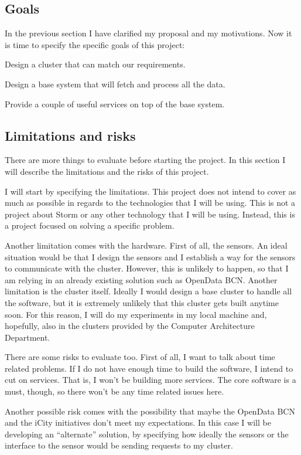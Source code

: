 \subsection{Goals}

In the previous section I have clarified my proposal and my motivations. Now
it is time to specify the specific goals of this project:

\mylist
  \item Design a cluster that can match our requirements.
  \item Design a base system that will fetch and process all the data.
  \item Provide a couple of useful services on top of the base system.
\mylistend

\subsection{Limitations and risks}

There are more things to evaluate before starting the project. In this section
I will describe the limitations and the risks of this project.

I will start by specifying the limitations. This project does not intend to
cover as much as possible in regards to the technologies that I will be using.
This is not a project about Storm or any other technology that I will be using.
Instead, this is a project focused on solving a specific problem.

Another limitation comes with the hardware. First of all, the sensors. An ideal
situation would be that I design the sensors and I establish a way for the
sensors to communicate with the cluster. However, this is unlikely to happen,
so that I am relying in an already existing solution such as OpenData BCN.
Another limitation is the cluster itself. Ideally I would design a base cluster
to handle all the software, but it is extremely unlikely that this cluster
gets built anytime soon. For this reason, I will do my experiments in my local
machine and, hopefully, also in the clusters provided by the Computer
Architecture Department.

There are some risks to evaluate too. First of all, I want to talk about time
related problems. If I do not have enough time to build the software, I intend
to cut on services. That is, I won't be building more services. The core
software is a must, though, so there won't be any time related issues here.

Another possible risk comes with the possibility that maybe the OpenData BCN
and the iCity initiatives don't meet my expectations. In this case I will be
developing an ``alternate'' solution, by specifying how ideally the sensors or
the interface to the sensor would be sending requests to my cluster.

